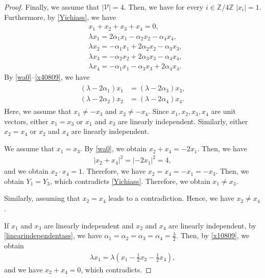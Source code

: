 \documentclass[reqno]{amsart}
\theoremstyle{plain}
\theoremstyle{definition}
\numberwithin{equation}{section}
\begin{document}
\begin{proof}
Finally, we assume that $|\mathcal{V}|=4$. Then, we have for every $i\in \mathbb{Z}/4\mathbb{Z}$ $|x_i|=1$. Furthermore, by \eqref{Yichiass}, we have
\begin{align}
&x_1+x_2+x_3+x_4=0, \label{wa0}
\\
&\lambda x_1=2\alpha_1x_1-\alpha_2x_2-\alpha_4x_4, \label{x10809}
\\
&\lambda x_2=-\alpha_1x_1+2\alpha_2x_2-\alpha_3x_3, \label{x20809}
\\
&\lambda x_3=-\alpha_2x_2+2\alpha_3x_3-\alpha_4x_4, \label{x30809}
\\
&\lambda x_4=-\alpha_1 x_1-\alpha_3x_3+2\alpha_4x_4. \label{x40809}
\end{align}
By \eqref{wa0}--\eqref{x40809}, we have
\begin{align}\label{linearindependentass}
\begin{aligned}
(\lambda-2\alpha_1)x_1&=(\lambda-2\alpha_3)x_3,
\\
(\lambda-2\alpha_2)x_2&=(\lambda-2\alpha_4)x_4.
\end{aligned}
\end{align}
Here, we assume that $x_1\neq -x_3$ and $x_2\neq -x_4$. Since $x_1,x_2,x_3,x_4$ are unit vectors, either $x_1=x_3$ or $x_1$ and $x_3$ are linearly independent. Similarly, either $x_2=x_4$ or $x_2$ and $x_4$ are linearly independent.

We assume that $x_1=x_3$. By \eqref{wa0}, we obtain $x_2+x_4=-2x_1$. Then, we have
\begin{align*}
\left|x_2+x_4\right|^2=\left|-2x_1\right|^2=4,
\end{align*}
and we obtain $x_2\cdot x_4=1$. Therefore, we have $x_2=x_4=-x_1=-x_3$. Then, we obtain $Y_1=Y_3$, which contradicts \eqref{Yichiass}. Therefore, we obtain $x_1\neq x_3$.

Similarly, assuming that $x_2=x_4$ leads to a contradiction. Hence, we have $x_2\neq x_4$.


If $x_1$ and $x_3$ are linearly independent and $x_2$ and $x_4$ are linearly independent, by \eqref{linearindependentass}, we have $\alpha_1=\alpha_2=\alpha_3=\alpha_4=\frac{\lambda}{2}$. Then, by \eqref{x10809}, we obtain
\begin{align*}
\lambda x_1=\lambda\left(x_1-\frac{1}{2}x_2-\frac{1}{2}x_4\right),
\end{align*}
and we have $x_2+x_4=0$, which contradicts.



\end{proof}
\end{document}
